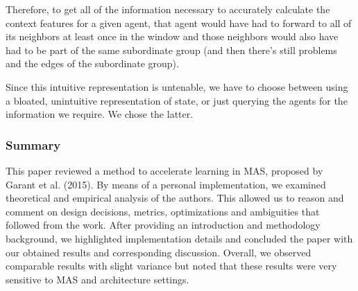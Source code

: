 \documentclass[letterpaper]{article}
\begin{document}
Therefore, to get all of the information necessary to accurately calculate the context features for a given agent, that agent would have had to forward to all of its neighbors at least once in the window and those neighbors would also have had to be part of the same subordinate group (and then there’s still problems and the edges of the subordinate group).

Since this intuitive representation is untenable, we have to choose between using a bloated, unintuitive representation of state, or just querying the agents for the information we require.  We chose the latter.

\subsubsection{Summary}
This paper reviewed a method to accelerate learning in MAS, proposed by Garant et al. (2015). By means of a personal implementation, we examined theoretical and empirical analysis of the authors. This allowed us to reason and comment on design decisions, metrics, optimizations and ambiguities that followed from the work. After providing an introduction and methodology background, we highlighted implementation details and concluded the paper with our obtained results and corresponding discussion. Overall, we observed comparable results with slight variance but noted that these results were very sensitive to MAS and architecture settings.
\end{document}
